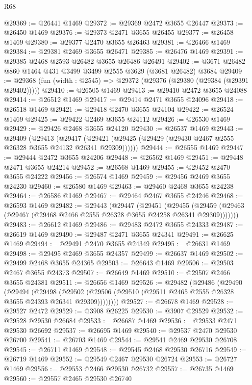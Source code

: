 \begin{lexlean}{R68}
\begin{coremodule}
@29369 := @26441 @1469
@29372 := @29369 @2472 @3655 @26447
@29373 := @26450 @1469
@29376 := @29373 @2471 @3655 @26455
@29377 := @26458 @1469
@29380 := @29377 @2470 @3655 @26463
@29381 := @26466 @1469
@29384 := @29381 @2469 @3655 @26471
@29385 := @26476 @1469
@29391 := @29385 @2468 @2593 @26482 @3655 @26486 @26491
@29402 := @3671 @26482 @860 @1464 @431 @3499 @3499 @2555 @3629 (@3681 @26482) @3684
@29409 := @29368 (fun (width : @2545) => @29372 (@29376 (@29380 (@29384 (@29391 @29402)))))
@29410 := @26505 @1469
@29413 := @29410 @2472 @3655 @24088
@29414 := @26512 @1469
@29417 := @29414 @2471 @3655 @24096
@29418 := @26518 @1469
@29421 := @29418 @2470 @3655 @24104
@29422 := @26524 @1469
@29425 := @29422 @2469 @3655 @24112
@29426 := @26530 @1469
@29429 := @29426 @2468 @3655 @24120
@29430 := @26537 @1469
@29443 := @29409
    (@29413
      (@29417 (@29421 (@29425 (@29429 (@29430 @2467 @2555 @26328 @3655 @24132 @26341 @29309))))))
@29444 := @26555 @1469
@29447 := @29444 @2472 @3655 @24206
@29448 := @26562 @1469
@29451 := @29448 @2471 @3655 @24214
@29452 := @26568 @1469
@29455 := @29452 @2470 @3655 @24222
@29456 := @26574 @1469
@29459 := @29456 @2469 @3655 @24230
@29460 := @26580 @1469
@29463 := @29460 @2468 @3655 @24238
@29464 := @26586 @1469
@29467 := @29464 @2467 @3655 @24246
@29468 := @26593 @1469
@29482 := @29443
    (@29447
      (@29451
        (@29455 (@29459 (@29463 (@29467 (@29468 @2466 @2555 @26328 @3655 @24258 @26341 @29309)))))))
@29483 := @26612 @1469
@29486 := @29483 @2472 @3655 @24333
@29487 := @26619 @1469
@29490 := @29487 @2471 @3655 @24341
@29491 := @26625 @1469
@29494 := @29491 @2470 @3655 @24349
@29495 := @26631 @1469
@29498 := @29495 @2469 @3655 @24357
@29499 := @26637 @1469
@29502 := @29499 @2468 @3655 @24365
@29503 := @26643 @1469
@29506 := @29503 @2467 @3655 @24373
@29507 := @26649 @1469
@29510 := @29507 @2466 @3655 @24381
@29511 := @26656 @1469
@29526 := @29482
    (@29486
      (@29490
        (@29494
          (@29498
            (@29502 (@29506 (@29510 (@29511 @2465 @2555 @26328 @3655 @24393 @26341 @29309))))))))
@29527 := @26678 @1469
@29528 := @29527 @2472
@29529 := @3908 @26225
@29530 := @3907 @29529
@29532 := @29528 @29530 @26684
@29533 := @26687 @1469
@29536 := @29533 @2471 @29530 @26692
@29537 := @26695 @1469
@29540 := @29537 @2470 @29530 @26700
@29541 := @26703 @1469
@29544 := @29541 @2469 @29530 @26708
@29545 := @26711 @1469
@29548 := @29545 @2468 @29530 @26716
@29549 := @26719 @1469
@29552 := @29549 @2467 @29530 @26724
@29553 := @26727 @1469
@29556 := @29553 @2466 @29530 @26732
@29557 := @26735 @1469
@29560 := @29557 @2465 @29530 @26740

\end{coremodule}
\end{lexlean}
